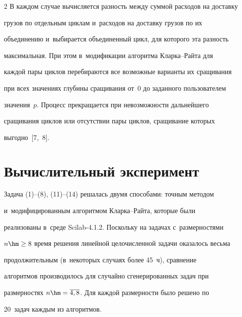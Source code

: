 \begin{multicols}{2}
  В каждом случае вычисляется разность между суммой расходов на доставку


грузов по отдельным циклам и~расходов на доставку грузов по их


объединению и~выбирается объединенный цикл, для которого эта разность


максимальная. При этом в~модификации алгоритма Клар\-ка--Рай\-та для


каждой пары циклов перебираются все возможные варианты их сращивания


при всех значениях глубины сращивания от~0 до заданного пользователем


значения~$p$. Процесс прекращается при невозможности дальнейшего


сращивания циклов или отсутствии пары циклов, сращивание которых


выгодно~[7,~8].





\vspace*{-9pt}





\section{Вычислительный эксперимент}





\vspace*{-2pt}





  Задача (1)--(8), (11)--(14) решалась двумя способами: точным методом


и~модифицированным алгоритмом Клар\-ка--Рай\-та, которые были


реализованы в~среде Scilab-4.1.2. Поскольку на задачах с~размерностями


$n\hm\geq 8$ время решения линейной целочисленной задачи оказалось весьма


продолжительным (в~некоторых случаях более 45~ч), сравнение


алгоритмов производилось для случайно сгенерированных задач при


размерностях $n\hm=\overline{4,8}$. Для каж\-дой размерности было решено по


20~задач каж\-дым из алгоритмов.






\end{multicols}
